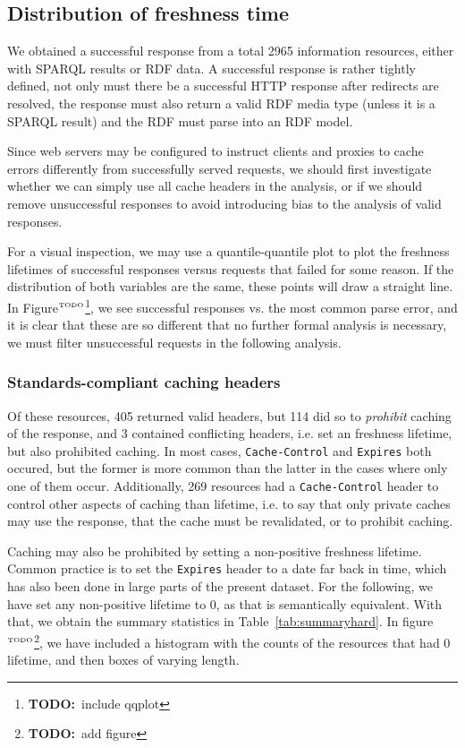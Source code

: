 \documentclass{llncs}
\newcommand{\httph}[1]{\texttt{#1}}
\newcommand{\todo}[1]{\ensuremath{^{\textrm{\tiny{TODO}\normalsize}}}\footnote{\textbf{TODO:}~#1}}
\begin{document}
\subsection{Distribution of freshness time}

We obtained a successful response from a total 2965 information
resources, either with SPARQL results or RDF data. A successful
response is rather tightly defined, not only must there be a
successful HTTP response after redirects are resolved, the response must also
return a valid RDF media type (unless it is a SPARQL result) and the
RDF must parse into an RDF model.

Since web servers may be configured to instruct clients and proxies to
cache errors differently from successfully served requests, we should
first investigate whether we can simply use all cache headers in the
analysis, or if we should remove unsuccessful responses to avoid
introducing bias to the analysis of valid responses.

For a visual inspection, we may use a quantile-quantile plot to plot
the freshness lifetimes of successful responses versus requests that
failed for some reason. If the distribution of both variables are the
same, these points will draw a straight line. In Figure\todo{include
  qqplot}, we see successful responses vs. the most common parse
error, and it is clear that these are so different that no further
formal analysis is necessary, we must filter unsuccessful requests in
the following analysis.


\subsubsection{Standards-compliant caching headers}

Of these resources, 405 returned valid headers, but 114 did so to
\emph{prohibit} caching of the response, and 3 contained conflicting
headers, i.e. set an freshness lifetime, but also prohibited
caching. In most cases, \httph{Cache-Control} and \httph{Expires} both
occured, but the former is more common than the latter in the cases
where only one of them occur.  Additionally, 269 resources had a
\httph{Cache-Control} header to control other aspects of caching than
lifetime, i.e. to say that only private caches may use the response,
that the cache must be revalidated, or to prohibit caching.

Caching may also be prohibited by setting a non-positive freshness
lifetime. Common practice is to set the \httph{Expires} header to a
date far back in time, which has also been done in large parts of the
present dataset. For the following, we have set any non-positive
lifetime to 0, as that is semantically equivalent. With that, we
obtain the summary statistics in Table~\ref{tab:summaryhard}. In
figure\todo{add figure}, we have included a histogram with the counts
of the resources that had 0 lifetime, and then boxes of varying length.
\end{document}
